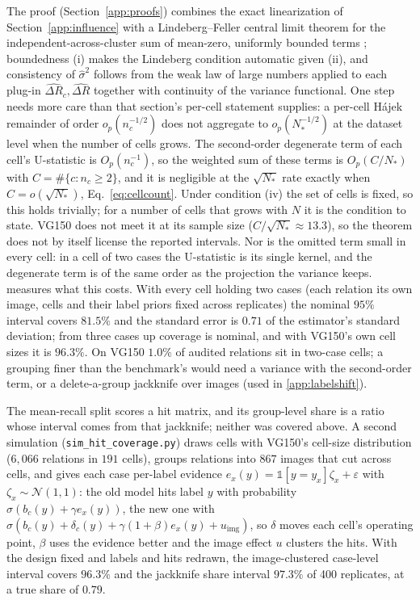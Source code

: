 The proof (Section~\ref{app:proofs}) combines the exact linearization of
Section~\ref{app:influence} with a Lindeberg--Feller central limit theorem for the
independent-across-cluster sum of mean-zero, uniformly bounded terms
\citep{serfling1980approximation,vandervaart1998asymptotic}; boundedness (i) makes the
Lindeberg condition automatic given (ii), and consistency of $\widehat\sigma^2$ follows
from the weak law of large numbers applied to each plug-in $\widehat{\Delta R}_c,
\widehat{\Delta R}$ together with continuity of the variance functional. One step needs
more care than that section's per-cell statement supplies: a per-cell H\'ajek remainder of
order $o_p(n_c^{-1/2})$ does not aggregate to $o_p(N_*^{-1/2})$ at the dataset level when
the number of cells grows. The second-order degenerate term of each cell's U-statistic is
$O_p(n_c^{-1})$, so the weighted sum of these terms is $O_p(C/N_*)$ with $C=\#\{c:n_c\ge2\}$,
and it is negligible at the $\sqrt{N_*}$ rate exactly when $C=o(\sqrt{N_*})$,
Eq.~\eqref{eq:cellcount}. Under condition (iv) the set of cells is fixed, so this holds
trivially; for a number of cells that grows with $N$ it is the condition to state. VG150 does
not meet it at its sample size ($C/\sqrt{N_*}\approx13.3$), so the theorem does not by itself
license the reported intervals. Nor is the omitted term small in every cell: in a cell of two
cases the U-statistic is its single kernel, and the degenerate term is of the same order as
the projection the variance keeps.  measures what this costs. With
every cell holding two cases (each relation its own image, cells and their label priors fixed
across replicates) the nominal $95\%$ interval covers $81.5\%$ and the standard error is $0.71$
of the estimator's standard deviation; from three cases up coverage is nominal, and with
VG150's own cell sizes it is $96.3\%$. On VG150 $1.0\%$ of audited relations sit in two-case
cells; a grouping finer than the benchmark's would need a variance with the second-order term,
or a delete-a-group jackknife over images (used in \cref{app:labelshift}).

The mean-recall split scores a hit matrix, and its group-level share is a ratio whose
interval comes from that jackknife; neither was covered above. A second simulation
(\texttt{sim\_hit\_coverage.py}) draws cells with VG150's cell-size distribution
($6{,}066$ relations in $191$ cells), groups relations into $867$ images that cut across
cells, and gives each case per-label evidence $e_x(y)=\mathbb 1[y=y_x]\zeta_x+\varepsilon$
with $\zeta_x\sim\mathcal N(1,1)$: the old model hits label $y$ with probability
$\sigma(b_c(y)+\gamma e_x(y))$, the new one with $\sigma(b_c(y)+\delta_c(y)+\gamma(1+\beta)
e_x(y)+u_{\mathrm{img}})$, so $\delta$ moves each cell's operating point, $\beta$ uses the
evidence better and the image effect $u$ clusters the hits. With the design fixed and labels
and hits redrawn, the image-clustered case-level interval covers $96.3\%$ and the
jackknife share interval $97.3\%$ of 400 replicates, at a true share of $0.79$.

